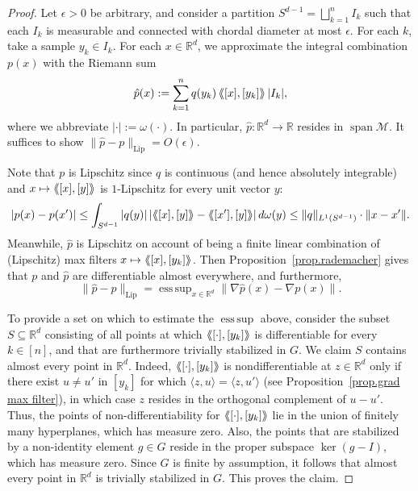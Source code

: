 \documentclass{article}
\theoremstyle{plain}
\theoremstyle{definition}
\newcommand{\llangle}{\langle\hspace{-2.5pt}\langle}
\newcommand{\rrangle}{\rangle\hspace{-2.5pt}\rangle}
\DeclareMathOperator*{\esssup}{ess\,sup}
\begin{document}
\begin{proof}
Let $\epsilon>0$ be arbitrary, and consider a partition $S^{d-1}=\bigsqcup_{k=1}^n I_k$ such that each $I_k$ is measurable and connected with chordal diameter at most $\epsilon$.
For each $k$, take a sample $y_k\in I_k$.
For each $x\in \mathbb{R}^d$, we approximate the integral combination $p(x)$ with the Riemann sum
\[
\hat{p}(x)
:=\sum_{k=1}^n q(y_k)\,\llangle[x],[y_k]\rrangle\,|I_k|,
\]
where we abbreviate $|\cdot|:=\omega(\cdot)$.
In particular, $\hat{p}\colon\mathbb{R}^d\to\mathbb{R}$ resides in $\operatorname{span}\mathcal{M}$.
It suffices to show $\|\hat{p}-p\|_{\operatorname{Lip}}=O(\epsilon)$.

Note that $p$ is Lipschitz since $q$ is continuous (and hence absolutely integrable) and $x\mapsto\llangle[x],[y]\rrangle$ is $1$-Lipschitz for every unit vector $y$:
\[
|p(x)-p(x')|
\leq \int_{S^{d-1}}|q(y)|\,|\llangle[x],[y]\rrangle-\llangle[x'],[y]\rrangle|\,d\omega(y)
\leq\|q\|_{L^1(S^{d-1})}\cdot\|x-x'\|.
\]
Meanwhile, $\hat{p}$ is Lipschitz on account of being a finite linear combination of (Lipschitz) max filters $x\mapsto \llangle[x],[y_k]\rrangle$.
Then Proposition~\ref{prop.rademacher} gives that $p$ and $\hat{p}$ are differentiable almost everywhere, and furthermore,
\begin{equation}
\label{eq.rademacher}
\|\hat{p}-p\|_{\operatorname{Lip}}
=\esssup_{x\in\mathbb{R}^d}\|\nabla \hat{p}(x)-\nabla p(x)\|.
\end{equation}

To provide a set on which to estimate the $\esssup$ above, consider the subset $S \subseteq \mathbb{R}^d$ consisting of all points at which $\llangle [\cdot],[y_k]\rrangle$ is differentiable for every $k \in [n]$, and that are furthermore trivially stabilized in $G$. 
We claim $S$ contains almost every point in $\mathbb{R}^d$.
Indeed, $\llangle [\cdot],[y_k]\rrangle$ is nondifferentiable at $z\in\mathbb{R}^d$ only if there exist $u\neq u'$ in $[y_k]$ for which $\langle z,u\rangle=\langle z,u'\rangle$ (see Proposition~\ref{prop.grad max filter}), in which case $z$ resides in the orthogonal complement of $u-u'$.
Thus, the points of non-differentiability for $\llangle [\cdot],[y_k]\rrangle$ lie in the union of finitely many hyperplanes, which has measure zero.
Also, the points that are stabilized by a non-identity element $g\in G$ reside in the proper subspace $\ker(g- I)$, which has measure zero.
Since $G$ is finite by assumption, it follows that almost every point in $\mathbb{R}^d$ is trivially stabilized in $G$.
This proves the claim.


\end{proof}
\end{document}
